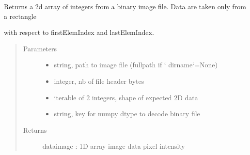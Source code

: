 \documentclass[letterpaper,10pt,english]{sphinxmanual}
\begin{document}

\begin{fulllineitems}
\label{\detokenize{PeakSearch:LaueTools.readmccd.readoneimage_crop_fast}}
Returns a 2d array of integers from a binary image file. Data are taken only from a rectangle

with respect to firstElemIndex and lastElemIndex.
\begin{quote}\begin{description}
\item[{Parameters}] \leavevmode\begin{itemize}
\item {} 
 \textendash{} string, path to image file (fullpath if {}` dirname{}`=None)

\item {} 
 \textendash{} integer, nb of file header bytes

\item {} 
 \textendash{} iterable of 2 integers, shape of expected 2D data

\item {} 
 \textendash{} string, key for numpy dtype to decode binary file

\end{itemize}

\item[{Returns}] \leavevmode
dataimage : 1D array image data pixel intensity

\end{description}\end{quote}

\end{fulllineitems}

\end{document}
